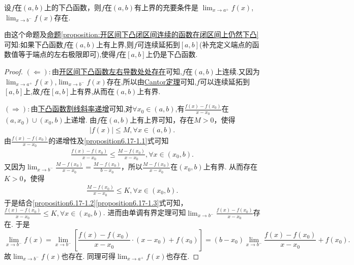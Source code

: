\documentclass[../../main.tex]{subfiles}
\begin{document}
\begin{proposition}\label{proposition:开区间的下凸函数有上界的充要条件}
设\(f\)在\((a,b)\)上的下凸函数，则\(f\)在\((a,b)\)有上界的充要条件是
$\lim_{x\rightarrow a^{+}}f(x)$,$\lim_{x\rightarrow b^{-}}f(x)$存在.
\end{proposition}
\begin{note}
由这个命题及\hyperref[proposition:开区间下凸闭区间连续的函数在闭区间上仍然下凸]{命题\ref{proposition:开区间下凸闭区间连续的函数在闭区间上仍然下凸}}可知:如果下凸函数$f$在$(a,b)$上有上界,则$f$可连续延拓到$[a,b]$(补充定义端点的函数值等于端点的左右极限即可),使得$f$在$[a,b]$上仍是下凸函数.
\end{note}
\begin{proof}
$(\Leftarrow):$由\hyperref[theorem:开区间下凸函数左右导数处处存在]{开区间下凸函数左右导数处处存在}可知,$f$在$(a,b)$上连续.又因为$\lim_{x\rightarrow a^{+}}f(x)$,$\lim_{x\rightarrow b^{-}}f(x)$存在,所以由\hyperref[theorem:Cantor定理]{Cantor定理}可知,$f$可以连续延拓到$[a,b]$上,故$f$在$[a,b]$上有界,从而在$(a,b)$上有界.

$(\Rightarrow):$由\hyperref[下凸函数割线斜率递增]{下凸函数割线斜率递增}可知,对$\forall x_0\in (a,b)$,有\(\frac{f(x) - f(x_0)}{x - x_0}\)在\((a, x_0)\cup(x_0, b)\)上递增. 由\(f\)在\((a, b)\)上有上界可知，存在\(M > 0\)，使得
\begin{align}
|f(x)|\leqslant M, \forall x\in(a, b). \label{proposition6.17-1.1}
\end{align}
由\(\frac{f(x) - f(x_0)}{x - x_0}\)的递增性及\eqref{proposition6.17-1.1}式可知
\begin{align}
\frac{f(x) - f(x_0)}{x - x_0}\leqslant\frac{M - f(x_0)}{x - x_0}, \forall x\in(x_0, b). \label{proposition6.17-1.2}
\end{align}
又因为\(\lim_{x\rightarrow b^-}\frac{M - f(x_0)}{x - x_0}=\frac{M - f(x_0)}{b - x_0}\)，所以\(\frac{M - f(x_0)}{x - x_0}\)在\((x_0, b)\)上有界. 从而存在\(K > 0\)，使得
\begin{align}
\frac{M - f(x_0)}{x - x_0}\leqslant K, \forall x\in(x_0, b).
\label{proposition6.17-1.3}  
\end{align}
于是结合\eqref{proposition6.17-1.2}\eqref{proposition6.17-1.3}式可知，\(\frac{f(x) - f(x_0)}{x - x_0}\leqslant K, \forall x\in(x_0, b)\). 进而由单调有界定理可知\(\lim_{x\rightarrow b^-}\frac{f(x) - f(x_0)}{x - x_0}\)存在. 于是
\[
\lim_{x\rightarrow b^-}f(x)=\lim_{x\rightarrow b^-}\left[\frac{f(x) - f(x_0)}{x - x_0}\cdot(x - x_0)+f(x_0)\right]=(b - x_0)\lim_{x\rightarrow b^-}\frac{f(x) - f(x_0)}{x - x_0}+f(x_0).
\]
故\(\lim_{x\rightarrow b^-}f(x)\)也存在. 同理可得\(\lim_{x\rightarrow a^+}f(x)\)也存在.

\end{proof}
\end{document}
